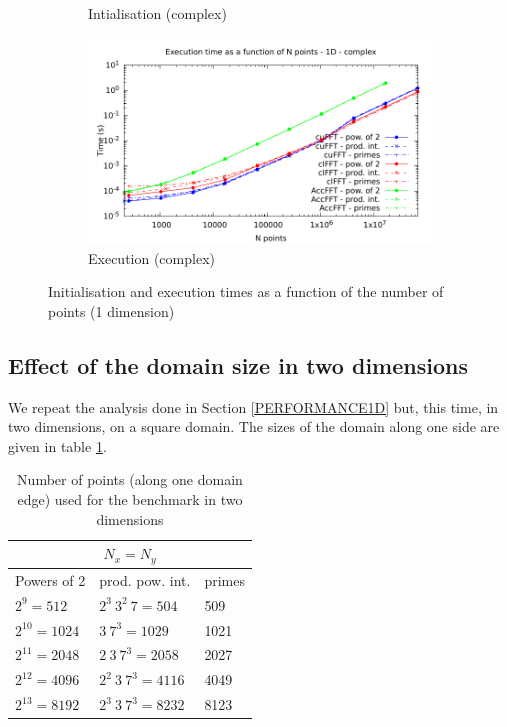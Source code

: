 \documentclass[12pt, a4paper]{article}
\begin{document}
\begin{figure}[H]
\begin{subfigure}{.5\textwidth}
\caption{Intialisation (complex)}
\label{FFT1DCI}
\end{subfigure}%
\begin{subfigure}{.5\textwidth}
\centering
\includegraphics[width=.9\linewidth]{graphs/fft-1d-c-exec.pdf}
\caption{Execution (complex)}
\label{FFT1DCE}
\end{subfigure}
\caption{Initialisation and execution times as a function of the number of points (1 dimension)}
\label{FFT1D}
\end{figure}

\subsection{Effect of the domain size in two dimensions}\label{PERFORMANCE2D}
We repeat the analysis done in Section \ref{PERFORMANCE1D} but, this
time, in two dimensions, on a square domain. The sizes of the domain along one side
are given in table \ref{2DSIZES}.

\begin{table}[H]
\centering
\begin{tabular}{|l|l|l|}
  \hline
  \multicolumn{3}{|c|}{$N_x=N_y$}\\
  \hline
  \hline
Powers of 2 & prod. pow. int. & primes\\ \hline
$2^9 = 512$ & $2^3\ 3^2\ 7 = 504$ & 509\\ \hline
$2^{10} = 1024$ & $3\ 7^3 = 1029$ & 1021\\ \hline
$2^{11} = 2048$	& $2\ 3 \ 7^3 = 2058$ &	2027\\ \hline
$2^{12} = 4096$	& $2^2\ 3\ 7^3 = 4116$ & 4049\\ \hline
$2^{13} = 8192$	& $2^3\ 3\ 7^3 = 8232$ & 8123\\ \hline
\end{tabular}
\caption{Number of points (along one domain edge) used for the benchmark in two dimensions}\label{2DSIZES}
\end{table}
\end{document}
